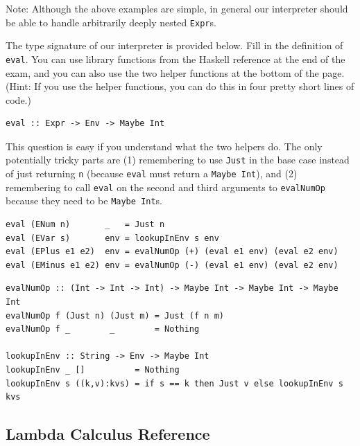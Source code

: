 \documentclass[addpoints]{exam}
\begin{document}
\begin{questions}
Note: Although the above examples are simple, in general our interpreter should be able to handle arbitrarily deeply nested \verb|Expr|s.

\newpage

\question[12] The type signature of our interpreter is provided below.  Fill in the definition of \verb|eval|.  You can use library functions from the Haskell reference at the end of the exam, and you can also use the two helper functions at the bottom of the page. (Hint: If you use the helper functions, you can do this in four pretty short lines of code.)

\begin{verbatim}
eval :: Expr -> Env -> Maybe Int
\end{verbatim}
\begin{solutionorbox}[3.5in]
This question is easy if you understand what the two helpers do.  The only potentially tricky parts are (1) remembering to use \verb|Just| in the base case instead of just returning \verb|n| (because \verb|eval| must return a \verb|Maybe Int|), and (2) remembering to call \verb|eval| on the second and third arguments to \verb|evalNumOp| because they need to be \verb|Maybe Int|s.
  
\begin{verbatim}
eval (ENum n)       _   = Just n
eval (EVar s)       env = lookupInEnv s env
eval (EPlus e1 e2)  env = evalNumOp (+) (eval e1 env) (eval e2 env)
eval (EMinus e1 e2) env = evalNumOp (-) (eval e1 env) (eval e2 env)
\end{verbatim}
\end{solutionorbox}

\begin{verbatim}
evalNumOp :: (Int -> Int -> Int) -> Maybe Int -> Maybe Int -> Maybe Int
evalNumOp f (Just n) (Just m) = Just (f n m)
evalNumOp f _        _        = Nothing

lookupInEnv :: String -> Env -> Maybe Int
lookupInEnv _ []          = Nothing
lookupInEnv s ((k,v):kvs) = if s == k then Just v else lookupInEnv s kvs
\end{verbatim}

\end{questions}

\newpage

\subsection*{Lambda Calculus Reference}
\end{document}

